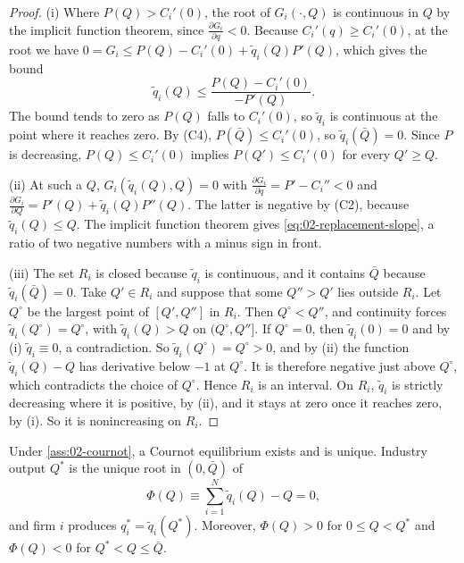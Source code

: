 \begin{proof}
(i) Where $P(Q) > C_i'(0)$, the root of $G_i(\cdot, Q)$ is continuous in $Q$ by the implicit function theorem,
since $\frac{\partial G_i}{\partial q} < 0$. Because $C_i'(q) \ge C_i'(0)$, at the root we have
$0 = G_i \le P(Q) - C_i'(0) + \tilde q_i(Q)P'(Q)$, which gives the bound
\[
  \tilde q_i(Q) \le \frac{P(Q) - C_i'(0)}{-P'(Q)} .
\]
The bound tends to zero as $P(Q)$ falls to $C_i'(0)$, so $\tilde q_i$ is continuous at the point where it reaches
zero. By (C4), $P(\bar Q) \le C_i'(0)$, so $\tilde q_i(\bar Q) = 0$. Since $P$ is decreasing, $P(Q) \le C_i'(0)$
implies $P(Q') \le C_i'(0)$ for every $Q' \ge Q$.

(ii) At such a $Q$, $G_i(\tilde q_i(Q), Q) = 0$ with $\frac{\partial G_i}{\partial q} = P' - C_i'' < 0$ and
$\frac{\partial G_i}{\partial Q} = P'(Q) + \tilde q_i(Q)P''(Q)$. The latter is negative by (C2), because
$\tilde q_i(Q) \le Q$. The implicit function theorem gives \eqref{eq:02-replacement-slope}, a ratio of two negative
numbers with a minus sign in front.

(iii) The set $R_i$ is closed because $\tilde q_i$ is continuous, and it contains $\bar Q$ because
$\tilde q_i(\bar Q) = 0$. Take $Q' \in R_i$ and suppose that some $Q'' > Q'$ lies outside $R_i$. Let $Q^\circ$ be
the largest point of $[Q', Q'']$ in $R_i$. Then $Q^\circ < Q''$, and continuity forces $\tilde q_i(Q^\circ) =
Q^\circ$, with $\tilde q_i(Q) > Q$ on $(Q^\circ, Q'']$. If $Q^\circ = 0$, then $\tilde q_i(0) = 0$ and by (i)
$\tilde q_i \equiv 0$, a contradiction. So $\tilde q_i(Q^\circ) = Q^\circ > 0$, and by (ii) the function
$\tilde q_i(Q) - Q$ has derivative below $-1$ at $Q^\circ$. It is therefore negative just above $Q^\circ$, which
contradicts the choice of $Q^\circ$. Hence $R_i$ is an interval. On $R_i$, $\tilde q_i$ is strictly decreasing where
it is positive, by (ii), and it stays at zero once it reaches zero, by (i). So it is nonincreasing on $R_i$.
\end{proof}

\begin{proposition}\label{prop:02-cournot-exist}
Under \cref{ass:02-cournot}, a Cournot equilibrium exists and is unique. Industry output $Q^*$ is the unique root
in $(0, \bar Q)$ of
\begin{equation}\label{eq:02-aggregate-eq}
  \Phi(Q) \equiv \sum_{i=1}^N \tilde q_i(Q) - Q = 0,
\end{equation}
and firm $i$ produces $q_i^* = \tilde q_i(Q^*)$. Moreover, $\Phi(Q) > 0$ for $0 \le Q < Q^*$ and $\Phi(Q) < 0$ for
$Q^* < Q \le \bar Q$.
\end{proposition}

